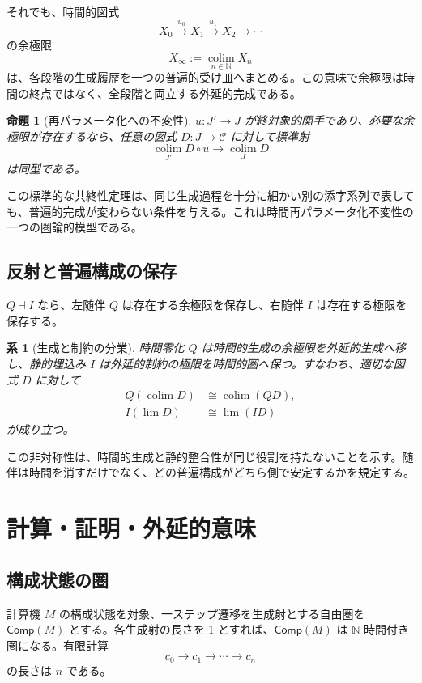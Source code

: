 \documentclass[a4paper,11pt]{ltjsarticle}
\newtheorem{proposition}[definition]{命題}
\newtheorem{corollary}[definition]{系}
\theoremstyle{remark}
\newcommand{\C}{\mathcal C}
\newcommand{\N}{\mathbb N}
\newcommand{\Comp}{\mathsf{Comp}}
\newcommand{\colim}{\operatorname*{colim}}
\newcommand{\liminv}{\operatorname*{lim}}
\begin{document}
それでも、時間的図式
\begin{equation}
 X_0\xrightarrow{u_0}X_1\xrightarrow{u_1}X_2\longrightarrow\cdots
 \label{eq:sequential-diagram}
\end{equation}
の余極限
\begin{equation}
 X_\infty:=\colim_{n\in\N}X_n
 \label{eq:temporal-colimit}
\end{equation}
は、各段階の生成履歴を一つの普遍的受け皿へまとめる。この意味で余極限は時間の終点ではなく、全段階と両立する外延的完成である。

\begin{proposition}[再パラメータ化への不変性]
$u:J'\to J$ が終対象的関手であり、必要な余極限が存在するなら、任意の図式 $D:J\to\C$ に対して標準射
\begin{equation}
 \colim_{J'}D\circ u\longrightarrow\colim_JD
\end{equation}
は同型である。
\end{proposition}

この標準的な共終性定理は、同じ生成過程を十分に細かい別の添字系列で表しても、普遍的完成が変わらない条件を与える。これは時間再パラメータ化不変性の一つの圏論的模型である。

\subsection{反射と普遍構成の保存}
$Q\dashv I$ なら、左随伴 $Q$ は存在する余極限を保存し、右随伴 $I$ は存在する極限を保存する。

\begin{corollary}[生成と制約の分業]
時間零化 $Q$ は時間的生成の余極限を外延的生成へ移し、静的埋込み $I$ は外延的制約の極限を時間的圏へ保つ。すなわち、適切な図式 $D$ に対して
\begin{align}
 Q\left(\colim D\right)&\cong\colim(QD),\\
 I\left(\liminv D\right)&\cong\liminv(ID)
\end{align}
が成り立つ。
\end{corollary}

この非対称性は、時間的生成と静的整合性が同じ役割を持たないことを示す。随伴は時間を消すだけでなく、どの普遍構成がどちら側で安定するかを規定する。

\section{計算・証明・外延的意味}

\subsection{構成状態の圏}
計算機 $M$ の構成状態を対象、一ステップ遷移を生成射とする自由圏を $\Comp(M)$ とする。各生成射の長さを $1$ とすれば、$\Comp(M)$ は $\N$ 時間付き圏になる。有限計算
\begin{equation}
 c_0\to c_1\to\cdots\to c_n
\end{equation}
の長さは $n$ である。
\end{document}

